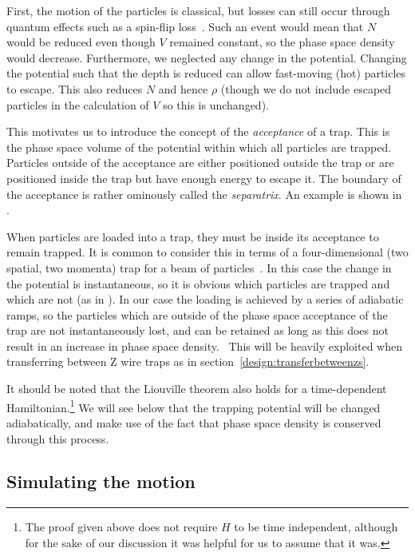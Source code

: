 First, the motion of the particles is classical, but losses can still occur
through quantum effects such as a spin-flip loss~\cite{PhysRevLett.51.1336}.
Such an event would mean that $N$ would be reduced even though $V$ remained
constant, so the phase space density would decrease. Furthermore, we neglected
any change in the potential.  Changing the potential such that the depth is
reduced can allow fast-moving (hot) particles to escape. This also reduces $N$
and hence $\rho$ (though we do not include escaped particles in the calculation
of $V$ so this is unchanged).

This motivates us to introduce the concept of the \emph{acceptance} of a trap.
This is the phase space volume of the potential within which all particles are
trapped. Particles outside of the acceptance are either positioned outside the
trap or are positioned inside the trap but have enough energy to escape it. The
boundary of the acceptance is rather ominously called the \emph{separatrix}. An
example is shown in .~\cite{Lichtenberg1969,
HanHand1998}

When particles are loaded into a trap, they must be inside its acceptance to
remain trapped. It is common to consider this in terms of a four-dimensional
(two spatial, two momenta) trap for a beam of particles~\cite{Crompvoets2005}.
In this case the change in the potential is instantaneous, so it is obvious
which particles are trapped and which are not (as in
). In our case the loading is achieved by
a series of adiabatic ramps, so the particles which are outside of the phase
space acceptance of the trap are not instantaneously lost, and can be retained
as long as this does not result in an increase in phase space density.~\cite{}
 This will be heavily exploited when
transferring between Z wire traps as in section~\ref{design:transferbetweenzs}.

It should be noted that the Liouville theorem also holds for a time-dependent
Hamiltonian.\footnote{The proof given above does not require $H$ to be time
independent, although for the sake of our discussion it was helpful for us to
assume that it was.} We will see below that the trapping potential will be changed
adiabatically, and make use of the fact that phase space density is conserved
through this process.

\subsection{Simulating the motion}
\label{design:motion:simmethods}

